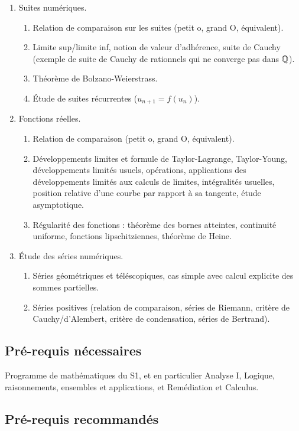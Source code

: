  \begin{enumerate}
 	\item
 	Suites numériques.
 	\begin{enumerate}
 		\item
 		Relation de comparaison sur les suites (petit o, grand O, équivalent).
 		\item
 		Limite sup/limite inf, notion de valeur d'adhérence, suite de Cauchy (exemple de suite de Cauchy de rationnels qui ne converge pas dans $\mathbb{Q}$).
 		\item
 		Théorème de Bolzano-Weierstrass.
 		\item
 		Étude de suites récurrentes ($u_{n+1} = f(u_n)$).
	\end{enumerate}
 	\item
 	Fonctions réelles.
 	\begin{enumerate}
 		\item
 		Relation de comparaison (petit o, grand O, équivalent).
 		\item
 		Développements limites et formule de Taylor-Lagrange, Taylor-Young, développements limités usuels, opérations, applications des développements limités aux calculs de limites, intégralités usuelles, position relative d'une courbe par rapport à sa tangente, étude asymptotique.
 		\item
 		Régularité des fonctions : théorème des bornes atteintes, continuité uniforme, fonctions lipschitziennes, théorème de Heine.
	\end{enumerate}
 	\item
 	Étude des séries numériques.
 	\begin{enumerate}
 		\item
 		Séries géométriques et téléscopiques, cas simple avec calcul explicite des sommes partielles.
 		\item
 		Séries positives (relation de comparaison, séries de Riemann, critère de Cauchy/d'Alembert, critère de condensation, séries de Bertrand).
	\end{enumerate}
\end{enumerate}

\subsection*{Pré-requis nécessaires}

Programme de mathématiques du S1, et en particulier Analyse I, Logique, raisonnements, ensembles et applications, et Remédiation et Calculus.

\subsection*{Pré-requis recommandés}

